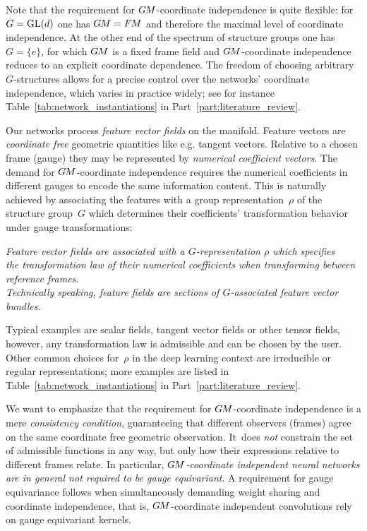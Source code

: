 Note that the requirement for $G\mkern-1.4muM$-coordinate independence is quite flexible:
for $G=\operatorname{GL}(d)$ one has $G\mkern-1.4muM=F\mkern-1.5muM$ and therefore the maximal level of coordinate independence.
At the other end of the spectrum of structure groups one has $G=\{e\}$, for which $G\mkern-1.4muM$ is a fixed frame field and $G\mkern-1.4muM$-coordinate independence reduces to an explicit coordinate dependence.
The freedom of choosing arbitrary $G$-structures allows for a precise control over the networks' coordinate independence,
which varies in practice widely; see for instance Table~\ref{tab:network_instantiations} in Part~\ref{part:literature_review}.


Our networks process \emph{feature vector fields} on the manifold.
Feature vectors are \emph{coordinate free} geometric quantities like e.g. tangent vectors.
Relative to a chosen frame (gauge) they may be represented by \emph{numerical coefficient vectors}.
The demand for $G\mkern-1.4muM$-coordinate independence requires the numerical coefficients in different gauges to encode the same information content.
This is naturally achieved by associating the features with a group representation~$\rho$ of the structure group~$G$ which determines their coefficients' transformation behavior under gauge transformations:
\begin{center}\it
    Feature vector fields are associated with a $G$-representation $\rho$ which specifies \\
    the transformation law of their numerical coefficients when transforming between reference frames.
    \\[1ex]
    Technically speaking, feature fields are sections of $G$-associated feature vector bundles.
\end{center}
Typical examples are scalar fields, tangent vector fields or other tensor fields, however, any transformation law is admissible and can be chosen by the user.
Other common choices for~$\rho$ in the deep learning context are irreducible or regular representations;
more examples are listed in Table~\ref{tab:network_instantiations} in Part~\ref{part:literature_review}.


We want to emphasize that the requirement for $G\mkern-1.4muM$-coordinate independence is a mere \emph{consistency condition}, guaranteeing that different observers (frames) agree on the same coordinate free geometric observation.
It~does \emph{not} constrain the set of admissible functions in any way, but only how their expressions relative to different frames relate.
In particular, \emph{$G\mkern-1.4muM$-coordinate independent neural networks are in general not required to be gauge equivariant}.
A requirement for gauge equivariance follows when simultaneously demanding weight sharing and coordinate independence, that is, $G\mkern-1.4muM$-coordinate independent convolutions rely on gauge equivariant kernels.



